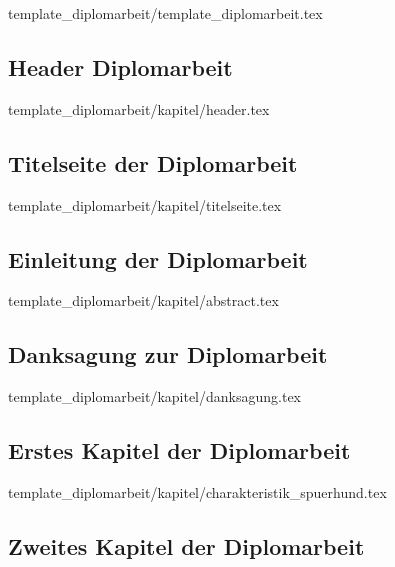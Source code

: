 
	{template_diplomarbeit/template_diplomarbeit.tex}


\newpage	
\subsection{Header Diplomarbeit}
\label{subsec:header}


	{template_diplomarbeit/kapitel/header.tex}


\newpage
\subsection{Titelseite der Diplomarbeit}


	{template_diplomarbeit/kapitel/titelseite.tex}


\newpage	
\subsection{Einleitung der Diplomarbeit}


	{template_diplomarbeit/kapitel/abstract.tex}

\subsection{Danksagung zur Diplomarbeit}


	{template_diplomarbeit/kapitel/danksagung.tex}


\newpage
\subsection{Erstes Kapitel der Diplomarbeit}


	{template_diplomarbeit/kapitel/charakteristik_spuerhund.tex}

\subsection{Zweites Kapitel der Diplomarbeit}
\label{subsec:zweites_kapitel}

